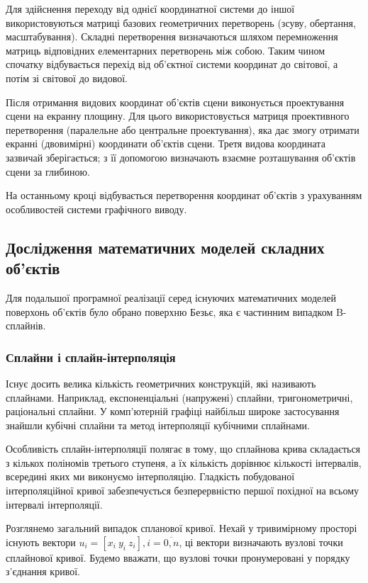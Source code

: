 \let\mypdfximage\pdfximage\def\pdfximage{\immediate\mypdfximage}\documentclass[14pt,a4paper]{extarticle}
\theoremstyle{definition}
\renewcommand{\[}{\begin{singlespace}\begin{equation*}}
\renewcommand{\]}{\end{equation*}\end{singlespace}}
\renewcommand{\+}{\discretionary{\mbox{\scriptsize$\hookleftarrow$}}{}{}}
\begin{document}
Для здійснення переходу від однієї координатної системи до іншої використовуються матриці базових геометричних перетворень (зсуву, обертання, масштабування). Складні перетворення визначаються шляхом перемноження матриць відповідних елементарних перетворень між собою. Таким чином спочатку відбувається перехід від об'єктної системи координат до світової, а потім зі світової до видової.

Після отримання видових координат об'єктів сцени виконується проектування сцени на екранну площину. Для цього використовується матриця проективного перетворення (паралельне або центральне проектування), яка дає змогу отримати екранні (двовимірні) координати об'єктів сцени. Третя видова координата зазвичай зберігається; з її допомогою визначають взаємне розташування об'єктів сцени за глибиною.

На останньому кроці відбувається перетворення координат об’єктів з урахуванням особливостей системи графічного виводу.

\subsection{Дослідження математичних моделей складних об'єктів}

Для подальшої програмної реалізації серед існуючих математичних моделей поверхонь об'єктів було обрано поверхню Безьє, яка є частинним випадком B-сплайнів.

\subsubsection{Сплайни і сплайн-інтерполяція}

Існує досить велика кількість геометричних конструкцій, які називають сплайнами. Наприклад, експоненціальні (напружені) сплайни, тригонометричні, раціональні сплайни. У комп'ютерній графіці найбільш широке застосування знайшли кубічні сплайни та метод інтерполяції кубічними сплайнами.

Особливість сплайн-інтерполяції полягає в тому, що сплайнова крива складається з кількох поліномів третього ступеня, а їх кількість дорівнює кількості інтервалів, всередині яких ми виконуємо інтерполяцію. Гладкість побудованої інтерполяційної кривої забезпечується безперервністю першої похідної на всьому інтервалі інтерполяції.

Розглянемо загальний випадок спланової кривої. Нехай у тривимірному просторі існують вектори $u_i = [x_i\ y_i\ z_i], i=\overline{0,n}$, ці вектори визначають вузлові точки сплайнової кривої. Будемо вважати, що вузлові точки пронумеровані у порядку з’єднання кривої.
\end{document}
